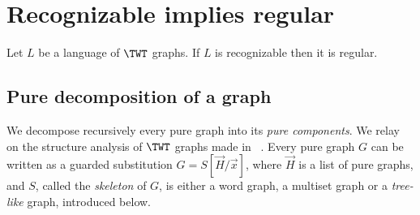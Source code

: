 \section{Recognizable implies regular}\label{sec:rec->reg}


\begin{theorem}\label{thm:Rec->Reg}
Let $L$ be a language of $\TWT$ graphs. If $L$ is recognizable then it is regular. 
\end{theorem}

\subsection{Pure decomposition of a graph}

We  decompose recursively every pure graph into its \emph{pure components}. We relay on the structure analysis of $\TWT$ graphs made in ~\cite{Cosme-LlopezP17}. Every pure graph $G$ can be written as a guarded substitution $G=S[\vec{H}/\vec{x}]$,  where $\vec{H}$ is a list of pure graphs, and  $S$, called the \emph{skeleton} of $G$, is either a word graph,  a multiset graph or a \emph{tree-like} graph, introduced below. 


